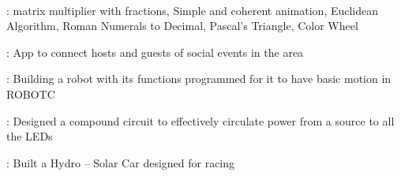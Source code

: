 \documentclass[]{deedy-resume-openfont}
\begin{document}
\begin{minipage}[t]{0.66\textwidth}
 \\
\begin{tightemize}
\item  {}: matrix multiplier with fractions, Simple and coherent animation, Euclidean Algorithm, Roman Numerals to Decimal, Pascal’s Triangle, Color Wheel
\item {}: App to connect hosts and guests of social events in the area
\item {}: Building a robot with its functions programmed for it to have basic motion in ROBOTC
\item {}: Designed a compound circuit to effectively circulate power from a source to all the LEDs
\item {}: Built a Hydro – Solar Car designed for racing
\end{tightemize}
\sectionsep






\end{minipage} 
\end{document}
